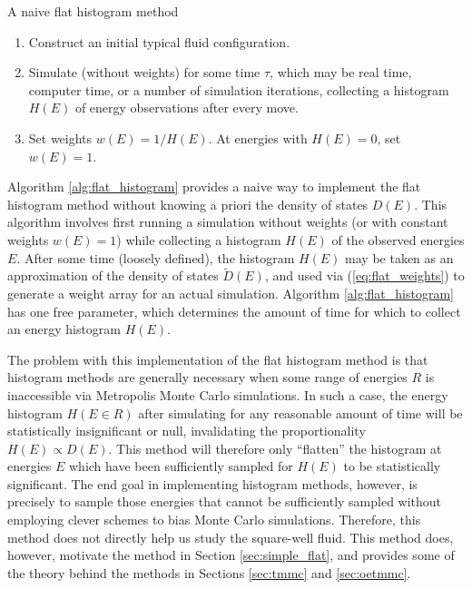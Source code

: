 \documentclass[11pt]{article}
\newcommand{\p}[1]{\left(#1\right)} %
\newenvironment{alg}
{\hrulefill\begin{enumerate}}
{\end{enumerate}\hrulefill}
\begin{document}
\begin{algorithm}[b]
  \caption{A naive flat histogram method}
  \label{alg:flat_histogram}
  \begin{alg}

  \item Construct an initial typical fluid configuration.

  \item Simulate (without weights) for some time $\tau$, which may be
    real time, computer time, or a number of simulation iterations,
    collecting a histogram $H\p{E}$ of energy observations after every
    move.

  \item Set weights $w\p{E}=1/H\p{E}$. At energies with $H\p{E}=0$,
    set $w\p{E}=1$.

  \end{alg}
\end{algorithm}

Algorithm \ref{alg:flat_histogram} provides a naive way to implement
the flat histogram method without knowing a priori the density of
states $D\p{E}$. This algorithm involves first running a simulation
without weights (or with constant weights $w\p{E}=1$) while collecting
a histogram $H\p{E}$ of the observed energies $E$. After some time
(loosely defined), the histogram $H\p{E}$ may be taken as an
approximation of the density of states $\tilde D\p{E}$, and used via
(\ref{eq:flat_weights}) to generate a weight array for an actual
simulation. Algorithm \ref{alg:flat_histogram} has one free parameter,
which determines the amount of time for which to collect an energy
histogram $H\p{E}$.

The problem with this implementation of the flat histogram method is
that histogram methods are generally necessary when some range of
energies $R$ is inaccessible via Metropolis Monte Carlo
simulations. In such a case, the energy histogram $H\p{E\in R}$ after
simulating for any reasonable amount of time will be statistically
insignificant or null, invalidating the proportionality $H\p{E}\propto
D\p{E}$. This method will therefore only ``flatten'' the histogram at
energies $E$ which have been sufficiently sampled for $H\p{E}$ to be
statistically significant. The end goal in implementing histogram
methods, however, is precisely to sample those energies that cannot be
sufficiently sampled without employing clever schemes to bias Monte
Carlo simulations. Therefore, this method does not directly help us
study the square-well fluid. This method does, however, motivate the
method in Section \ref{sec:simple_flat}, and provides some of the
theory behind the methods in Sections \ref{sec:tmmc} and
\ref{sec:oetmmc}.
\end{document}
